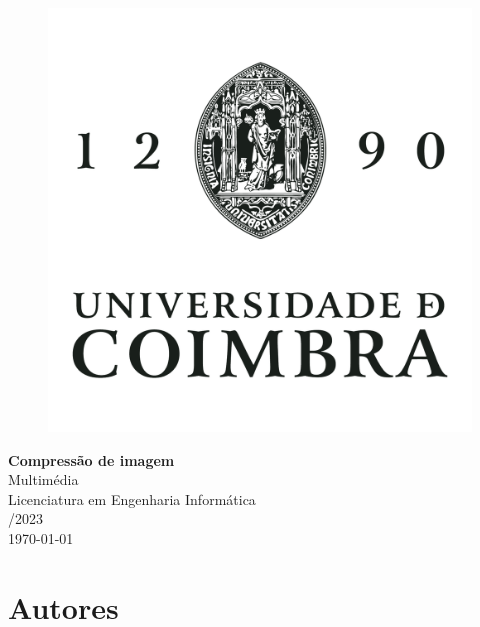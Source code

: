 \documentclass[a4paper, 12pt]{article}
\begin{document}
\begin{titlepage}
	\centering

	\begin{figure}[H]
		\centering
		\includegraphics[scale=0.15]{resources/uc.png}
	\end{figure}

	\vspace{5cm}
	\Huge{\sffamily \textbf {Compressão de imagem}} \\
	\vspace{0.2cm}
	\LARGE{\sffamily Multimédia} \\

 
	\vspace{1cm}
	\Large{\sffamily Licenciatura em Engenharia Informática} \\
	\Large{/2023} \\
	\vspace{0.4cm}
	\large{\sffamily\today}
\end{titlepage}

\section*{Autores}
\end{document}
